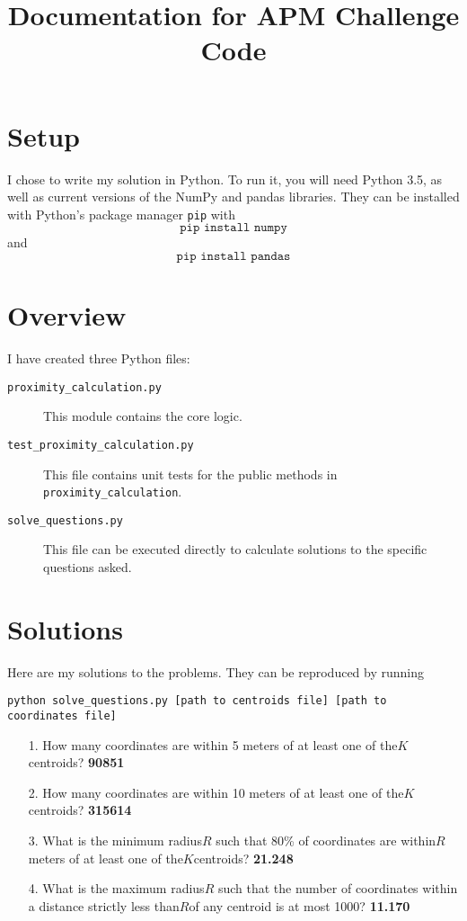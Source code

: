 \documentclass{amsart}
\theoremstyle{definition}
\theoremstyle{definition}
\begin{document}
\title[Documentation for APM Challenge Code]{Documentation for APM Challenge Code}

\date{}

\maketitle

\section{Setup}
I chose to write my solution in Python.  To run it, you will need Python 3.5, as well as current versions of the NumPy and pandas libraries.  They can be installed with Python's package manager \texttt{pip} with
\[
\texttt{pip install numpy}
\]
and
\[
\texttt{pip install pandas}
\]

\section{Overview}
I have created three Python files:
\begin{description}
\item[\texttt{proximity\_calculation.py}] This module contains the core logic.
\item[\texttt{test\_proximity\_calculation.py}] This file contains unit tests for the public methods in \texttt{proximity\_calculation}.
\item[\texttt{solve\_questions.py}] This file can be executed directly to calculate solutions to the specific questions asked.
\end{description}

\section{Solutions}
Here are my solutions to the problems.  They can be reproduced by running
\begin{center}
  \texttt{python solve\_questions.py [path to centroids file] [path to coordinates file]}
\end{center}
\begin{itemize}
  \item[1.] How many coordinates are within 5 meters of at least one of the ​$K$ ​centroids? \textbf{90851}
  \item[2.] How many coordinates are within 10 meters of at least one of the ​$K$ ​centroids? \textbf{315614}
  \item[3.] What is the minimum radius ​$R$ such that 80\% of coordinates are within ​$R$ ​meters of at least one of the ​$K$ ​centroids? \textbf{21.248}
  \item[4.] What is the maximum radius ​$R$ such that the number of coordinates within a distance strictly less than ​$R$ ​of any centroid is at most 1000? \textbf{11.170}
\end{itemize}
\end{document}
